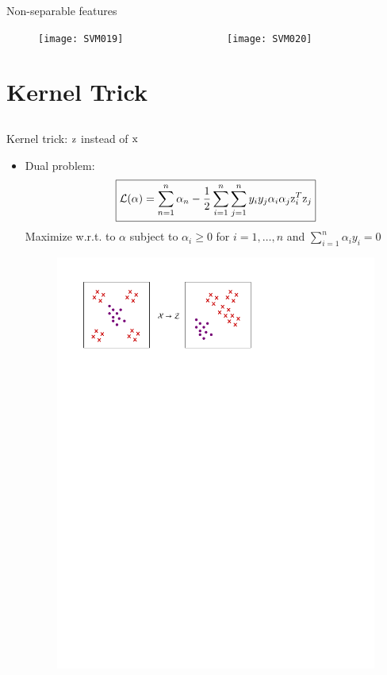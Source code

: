 \begin{frame}{Non-separable features}
\begin{figure}
\texttt{[image: SVM019]}~~~~~~~~~~~~~~~~~~
\texttt{[image: SVM020]}
\end{figure}
\end{frame}

\section{Kernel Trick}
\subsection{}
\begin{frame}{Kernel trick: ${\rm z}$ instead of ${\rm x}$}
\begin{itemize}
\item Dual problem:
\[\boxed{\mathcal{L}(\alpha ) = \sum_{n=1}^{n}\alpha_n -\frac{1}{2}\sum_{i=1}^{n} \sum\limits_{j= 1}^n y_iy_j\alpha_i\alpha_j {\rm z}_i^T{\rm z}_j}\]
Maximize w.r.t. to $\alpha$ subject to $\alpha_i\geq 0$ for $i=1,\ldots,n$ and $\sum_{i=1}^n\alpha_iy_i =0$
\begin{figure}
\includegraphics[scale=0.8]{Figures/SVM07.pdf}
\end{figure}
\end{itemize}
\end{frame}

